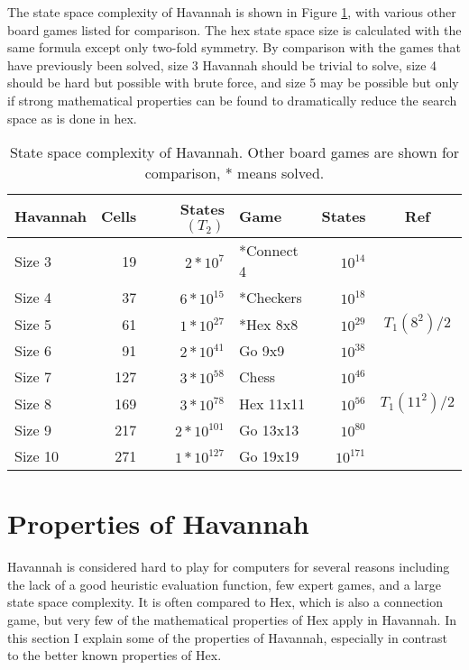 The state space complexity of Havannah is shown in Figure \ref{table:complexity}, with various other board games listed for comparison. The hex state space size is calculated with the same formula except only two-fold symmetry. By comparison with the games that have previously been solved, size 3 Havannah should be trivial to solve, size 4 should be hard but possible with brute force, and size 5 may be possible but only if strong mathematical properties can be found to dramatically reduce the search space as is done in hex.

\begin{table}
	\centering
	\begin{tabular}{lrr|lrc}
	Havannah & Cells & States $(T_2)$ & Game     & States     & Ref \\ \hline
	Size 3   &    19 & $2*10^{7}$   & *Connect 4 & $10^{14}$  & \cite{trompconnect4} \\
	Size 4   &    37 & $6*10^{15}$  & *Checkers  & $10^{18}$  & \cite{schaeffer1998solving}\\
	Size 5   &    61 & $1*10^{27}$  & *Hex 8x8   & $10^{29}$  & $T_1(8^2)/2$\\
	Size 6   &    91 & $2*10^{41}$  & Go 9x9     & $10^{38}$  & \cite{tromp2007combinatorics}\\
	Size 7   &   127 & $3*10^{58}$  & Chess      & $10^{46}$  & \cite{tromp2010chess}\\
	Size 8   &   169 & $3*10^{78}$  & Hex 11x11  & $10^{56}$  & $T_1(11^2)/2$\\
	Size 9   &   217 & $2*10^{101}$ & Go 13x13   & $10^{80}$  & \cite{tromp2007combinatorics}\\
	Size 10  &   271 & $1*10^{127}$ & Go 19x19   & $10^{171}$ & \cite{tromp2007combinatorics}\\
	\end{tabular}
	\caption{State space complexity of Havannah. Other board games are shown for comparison, * means solved.}
	\label{table:complexity}
\end{table}

\section{Properties of Havannah}

Havannah is considered hard to play for computers for several reasons including the lack of a good heuristic evaluation function, few expert games, and a large state space complexity. It is often compared to Hex, which is also a connection game, but very few of the mathematical properties of  Hex apply in Havannah. In this section I explain some of the properties of Havannah, especially in contrast to the better known properties of Hex.



